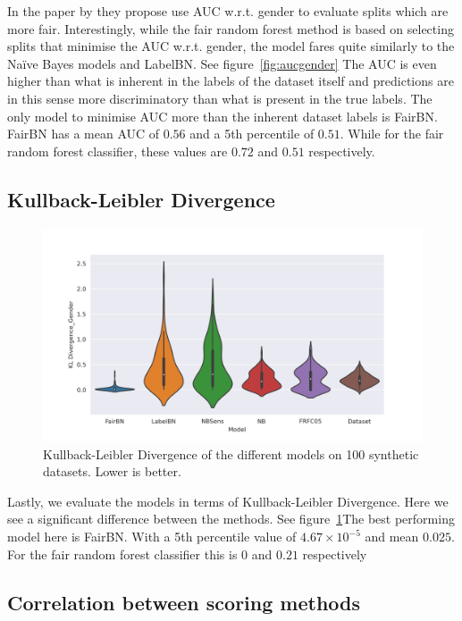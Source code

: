 In the paper by \citet{Antonio:2021:arXiv} they propose use AUC w.r.t. gender to evaluate splits which are more fair. Interestingly, while the fair random forest method is based on selecting splits that minimise the AUC w.r.t. gender, the model fares quite similarly to the Naïve Bayes models and LabelBN. See figure~\ref{fig:aucgender} The AUC is even higher than what is inherent in the labels of the dataset itself and predictions are in this sense more discriminatory than what is present in the true labels. The only model to minimise AUC more than the inherent dataset labels is FairBN. FairBN has a mean AUC of $0.56$ and a 5th percentile of $0.51$. While for the fair random forest classifier, these values are $0.72$ and $0.51$ respectively.

\subsection{Kullback-Leibler Divergence}

\begin{figure}
    \centering
    \includegraphics[width=\linewidth]{figures/kldg-synthetic.png}
    \caption{Kullback-Leibler Divergence of the different models on 100 synthetic datasets. Lower is better.}
    \label{fig:kldg-synthetic}
\end{figure}

Lastly, we evaluate the models in terms of Kullback-Leibler Divergence. Here we see a significant difference between the methods. See figure~\ref{fig:kldg-synthetic}The best performing model here is FairBN. With a 5th percentile value of $4.67 \times 10^{-5}$ and mean $0.025$. For the fair random forest classifier this is $0$ and $0.21$ respectively

\subsection{Correlation between scoring methods}

